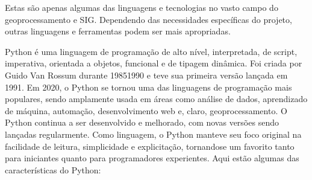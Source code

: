 \documentclass[letterpaper,10pt,english]{jupyterBook}
\begin{document}
\sphinxAtStartPar
Estas são apenas algumas das linguagens e tecnologias no vasto campo do geoprocessamento e SIG. Dependendo das necessidades específicas do projeto, outras linguagens e ferramentas podem ser mais apropriadas.

\sphinxAtStartPar
{}

\sphinxAtStartPar
Python é uma linguagem de programação de alto nível, interpretada, de script, imperativa, orientada a objetos, funcional e de tipagem dinâmica. Foi criada por Guido Van Rossum durante 1985\sphinxhyphen{}1990 e teve sua primeira versão lançada em 1991. Em 2020, o Python se tornou uma das linguagens de programação mais populares, sendo amplamente usada em áreas como análise de dados, aprendizado de máquina, automação, desenvolvimento web e, claro, geoprocessamento.
O Python continua a ser desenvolvido e melhorado, com novas versões sendo lançadas regularmente. Como linguagem, o Python manteve seu foco original na facilidade de leitura, simplicidade e explicitação, tornando\sphinxhyphen{}se um favorito tanto para iniciantes quanto para programadores experientes. Aqui estão algumas das características do Python:
\end{document}

